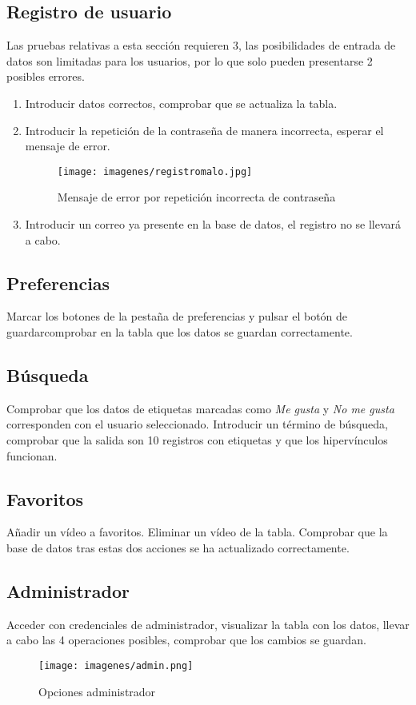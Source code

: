 \documentclass[a4paper,12pt,twoside]{memoir}
\begin{document}
\subsection{Registro de usuario}
Las pruebas relativas a esta sección requieren 3, las posibilidades de entrada de datos son limitadas para los usuarios, por lo que solo pueden presentarse 2 posibles errores.
\begin{enumerate}
    \item Introducir datos correctos, comprobar que se actualiza la tabla.
    \item Introducir la repetición de la contraseña de manera incorrecta, esperar el mensaje de error.
     \begin{figure}
    \centering
    \texttt{[image: imagenes/registromalo.jpg]}
    \caption{Mensaje de error por repetición incorrecta de contraseña}
    \label{fig:enter-label}
\end{figure}
    \item Introducir un correo ya presente en la base de datos, el registro no se llevará a cabo.  
\end{enumerate}
\subsection{Preferencias}
Marcar los botones de la pestaña de preferencias y pulsar el botón de guardarcomprobar en la tabla que los datos se guardan correctamente.

\subsection{Búsqueda}
Comprobar que los datos de etiquetas marcadas como \textit{Me gusta} y \textit{No me gusta} corresponden con el usuario seleccionado. Introducir un término de búsqueda, comprobar que la salida son 10 registros con etiquetas y que los hipervínculos funcionan.

\subsection{Favoritos}
Añadir un vídeo a favoritos. Eliminar un vídeo de la tabla. Comprobar que la base de datos tras estas dos acciones se ha actualizado correctamente.

\subsection{Administrador}
Acceder con credenciales de administrador, visualizar la tabla con los datos, llevar a cabo las 4 operaciones posibles, comprobar que los cambios se guardan.
\begin{figure}
    \centering
    \texttt{[image: imagenes/admin.png]}
    \caption{Opciones administrador}
    \label{fig:enter-label}
\end{figure}
\end{document}
